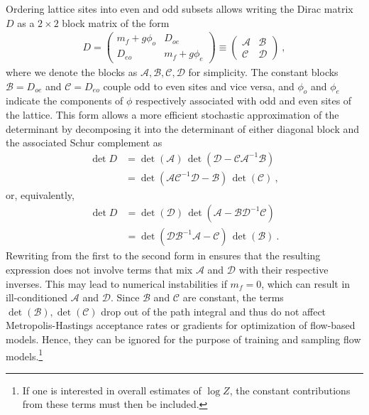 \documentclass[aps,prd,twocolumn,nofootinbib,superscriptaddress,preprintnumbers]{revtex4-1}
\begin{document}
Ordering lattice sites into even and odd subsets allows writing the Dirac matrix $D$ as a $2 \times 2$ block matrix of the form
%
\begin{equation}
\begin{aligned}
  D = \begin{pmatrix}
    m_f + g\phi_o & D_{oe} \\
    D_{eo} & m_f + g\phi_e
    \end{pmatrix}
  \equiv \begin{pmatrix}
    \mathcal{A} & \mathcal{B} \\
    \mathcal{C} & \mathcal{D}
    \end{pmatrix}\ ,
\end{aligned}
\end{equation}
%
where we denote the blocks as $\mathcal{A},\mathcal{B},\mathcal{C},\mathcal{D}$ for simplicity. The constant blocks $\mathcal{B} = D_{oe}$ and $\mathcal{C} = D_{eo}$ couple odd to even sites and vice versa, and $\phi_o$ and $\phi_e$ indicate the components of $\phi$ respectively associated with odd and even sites of the lattice. This form allows a more efficient stochastic approximation of the determinant by decomposing it into the determinant of either diagonal block and the associated Schur complement as
%
\begin{equation}\label{eq:Deo-1}
\begin{aligned}
  \det D &= \det(\mathcal{A})\, \det(\mathcal{D} - \mathcal{C} \mathcal{A}^{-1} \mathcal{B}) \\
         &= \det(\mathcal{A} \mathcal{C}^{-1} \mathcal{D} - \mathcal{B})\, \det(\mathcal{C})\ ,
\end{aligned}
\end{equation}
%
or, equivalently,
%
\begin{equation}\label{eq:Deo-2}
\begin{aligned}
  \det D &= \det(\mathcal{D})\, \det(\mathcal{A} - \mathcal{B} \mathcal{D}^{-1} \mathcal{C}) \\
         &= \det(\mathcal{D} \mathcal{B}^{-1} \mathcal{A} - \mathcal{C})\, \det(\mathcal{B})\ .
\end{aligned}
\end{equation}
%
Rewriting from the first to the second form in  ensures that the resulting expression does not involve terms that mix $\mathcal{A}$ and $\mathcal{D}$ with their respective inverses. This may lead to numerical instabilities if $m_f = 0$, which can result in ill-conditioned $\mathcal{A}$ and $\mathcal{D}$. Since $\mathcal{B}$ and $\mathcal{C}$ are constant, the terms $\det(\mathcal{B}),\det(\mathcal{C})$ drop out of the path integral and thus do not affect Metropolis-Hastings acceptance rates or gradients for optimization of flow-based models. Hence, they can be ignored for the purpose of training and sampling flow models.\footnote{If one is interested in overall estimates of $\log{Z}$, the constant contributions from these terms must then be included.}
\end{document}
